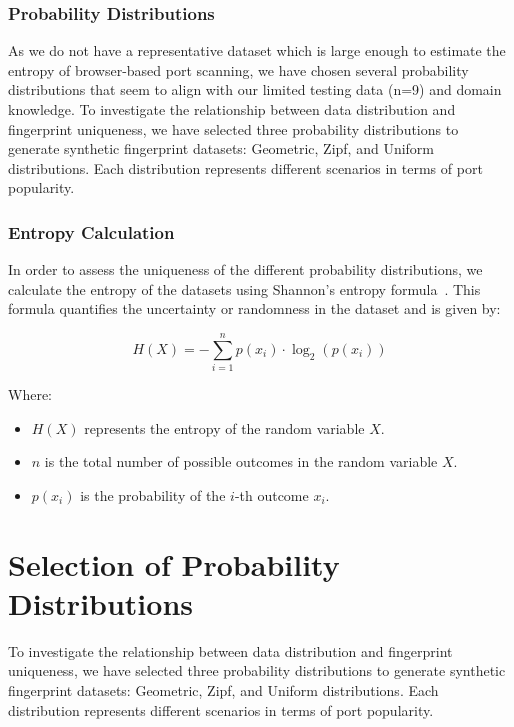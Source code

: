 \subsubsection{Probability Distributions}

As we do not have a representative dataset which is large enough to estimate the entropy of browser-based port scanning, we have chosen several probability distributions that seem to align with our limited testing data (n=9) and domain knowledge.
To investigate the relationship between data distribution and fingerprint uniqueness, we have selected three probability distributions to generate synthetic fingerprint datasets: Geometric, Zipf, and Uniform distributions. Each distribution represents different scenarios in terms of port popularity.

\subsubsection{Entropy Calculation}

In order to assess the uniqueness of the different probability distributions, we calculate the entropy of the datasets using Shannon's entropy formula~. This formula quantifies the uncertainty or randomness in the dataset and is given by:

\[
H(X) = -\sum_{i=1}^{n} p(x_i) \cdot \log_{2}(p(x_i))
\]

Where:
\begin{itemize}
  \item $H(X)$ represents the entropy of the random variable $X$.
  \item $n$ is the total number of possible outcomes in the random variable $X$.
  \item $p(x_i)$ is the probability of the $i$-th outcome $x_i$.
\end{itemize}


\section{Selection of Probability Distributions}

To investigate the relationship between data distribution and fingerprint uniqueness, we have selected three probability distributions to generate synthetic fingerprint datasets: Geometric, Zipf, and Uniform distributions. Each distribution represents different scenarios in terms of port popularity.


